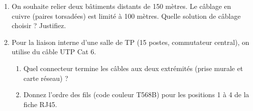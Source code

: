 \documentclass[11pt]{article}
\begin{document}
\begin{exercice}
\begin{enumerate}
    \item On souhaite relier deux bâtiments distants de 150 mètres. Le câblage en cuivre (paires torsadées) est limité à 100 mètres. Quelle solution de câblage choisir ? Justifiez.
    \item Pour la liaison interne d'une salle de TP (15 postes, commutateur central), on utilise du câble UTP Cat 6.
    \begin{enumerate}
        \item Quel connecteur termine les câbles aux deux extrémités (prise murale et carte réseau) ?
        \item Donnez l'ordre des fils (code couleur T568B) pour les positions 1 à 4 de la fiche RJ45.
    \end{enumerate}
\end{enumerate}
\end{exercice}
\end{document}
